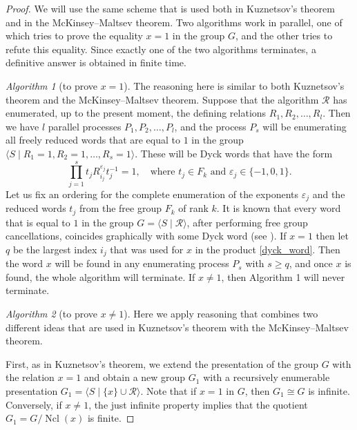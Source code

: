 \documentclass[12pt,a4paper]{amsart}
\DeclareMathOperator{\Ncl}{Ncl}
\begin{document}
\begin{proof}
We will use the same scheme that is used both in Kuznetsov's theorem and in the McKinsey--Maltsev theorem. Two algorithms work in parallel, one of which tries to prove the equality $x=1$ in the group $G$, and the other tries to refute this equality. Since exactly one of the two algorithms terminates, a definitive answer is obtained in finite time.

\smallskip

\emph{Algorithm 1} (to prove $x=1$). The reasoning here is similar to both Kuznetsov's theorem and the McKinsey–Maltsev theorem. Suppose that the algorithm $\mathcal{R}$ has enumerated, up to the present moment, the defining relations $R_1, R_2, \ldots, R_l$. Then we have $l$ parallel processes $P_1,P_2,\ldots,P_l$, and the process $P_s$ will be enumerating all freely reduced words that are equal to $1$ in the group $\langle S \mid R_1=1, R_2=1, \ldots, R_s=1 \rangle$. These will be Dyck words that have the form
\begin{equation}
\prod_{j=1}^s t_j R^{\varepsilon_j}_{i_j} t_j^{-1}=1, \quad \text{where } t_j\in F_k \text{ and } \varepsilon_{j}\in \{-1,0,1\}.
\label{dyck_word}
\end{equation}
Let us fix an ordering for the complete enumeration of the exponents $\varepsilon_{j}$ and the reduced words $t_j$ from the free group $F_k$ of rank $k$. It is known that every word that is equal to $1$ in the group $G=\langle S \mid \mathcal{R} \rangle$, after performing free group cancellations, coincides graphically with some Dyck word (see \cite[Lemma 5.1]{AdianDurnev2000}). If $x=1$ then let $q$ be the largest index $i_j$ that was used for $x$ in the product \eqref{dyck_word}. Then the word $x$ will be found in any enumerating process $P_s$ with $s\geq q$, and once $x$ is found, the whole algorithm will terminate. If $x\ne 1$, then Algorithm 1 will never terminate.

\medskip

\emph{Algorithm 2} (to prove $x\ne 1$). Here we apply reasoning that combines two different ideas that are used in Kuznetsov's theorem with the McKinsey--Maltsev theorem.

First, as in Kuznetsov's theorem, we extend the presentation of the group $G$ with the relation $x=1$ and obtain a new group $G_1$ with a recursively enumerable presentation $G_1=\langle S \mid \{x\} \cup \mathcal R\rangle$. Note that if $x=1$ in $G$, then $G_1 \cong G$ is infinite. Conversely, if $x \neq 1$, the just infinite property implies that the quotient $G_1 = G/\Ncl(x)$ is finite.


\end{proof}
\end{document}
